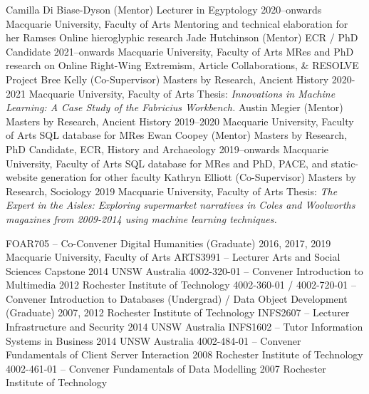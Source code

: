 \begin{cventries}
\cventry
    {Camilla Di Biase-Dyson (Mentor)}
    {Lecturer in Egyptology}
    {2020--onwards}
    {Macquarie University, Faculty of Arts}
    {Mentoring and technical elaboration for her Ramses Online hieroglyphic research}
\cventry
    {Jade Hutchinson (Mentor)}
    {ECR / PhD Candidate}
    {2021--onwards}
    {Macquarie University, Faculty of Arts}
    {MRes and PhD research on Online Right-Wing Extremism, Article Collaborations, \& RESOLVE Project}
\cventry
    {Bree Kelly (Co-Supervisor)}
    {Masters by Research, Ancient History}
    {2020-2021}
    {Macquarie University, Faculty of Arts}
    {Thesis: \textit{Innovations in Machine Learning: A Case Study of the Fabricius Workbench.}}
\cventry
    {Austin Megier (Mentor)}
    {Masters by Research, Ancient History}
    {2019--2020}
    {Macquarie University, Faculty of Arts}
    {SQL database for MRes}
\cventry
    {Ewan Coopey (Mentor)}
    {Masters by Research, PhD Candidate, ECR, History and Archaeology}
    {2019--onwards}
    {Macquarie University, Faculty of Arts}
    {SQL database for MRes and PhD, PACE, and static-website generation for other faculty}        
\cventry
    {Kathryn Elliott (Co-Supervisor)}
    {Masters by Research, Sociology}
    {2019}
    {Macquarie University, Faculty of Arts}
    {Thesis: \textit{The Expert in the Aisles: Exploring
supermarket narratives in Coles and Woolworths magazines from 2009-2014 using machine learning techniques.}}
    
\end{cventries}





\begin{cventries}
\cventry
    {FOAR705 -- Co-Convener}
    {Digital Humanities (Graduate)}
    {2016, 2017, 2019}
    {Macquarie University, Faculty of Arts}
    {}
\cventry
    {ARTS3991 -- Lecturer}
    {Arts and Social Sciences Capstone}
    {2014}
    {UNSW Australia}
    {}  
\cventry
    {4002-320-01 -- Convener}
    {Introduction to Multimedia}
    {2012}
    {Rochester Institute of Technology}
    {}  
\cventry
    {4002-360-01 / 4002-720-01 -- Convener}
    {Introduction to Databases (Undergrad) / Data Object Development (Graduate)}
    {2007, 2012}
    {Rochester Institute of Technology}
    {}   
\cventry
    {INFS2607 -- Lecturer}
    {Infrastructure and Security}
    {2014}
    {UNSW Australia}
    {}     
\cventry
    {INFS1602 -- Tutor}
    {Information Systems in Business}
    {2014}
    {UNSW Australia}
    {}    
\cventry
    {4002-484-01 -- Convener}
    {Fundamentals of Client Server Interaction}
    {2008}
    {Rochester Institute of Technology}
    {}      
\cventry
    {4002-461-01 -- Convener}
    {Fundamentals of Data Modelling}
    {2007}
    {Rochester Institute of Technology}
    {}     
\end{cventries}


